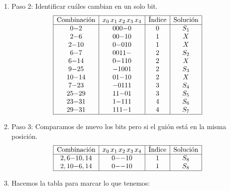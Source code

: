 \documentclass[12pt,letterpaper]{article}
\begin{document}
\begin{enumerate}[label=\arabic*.]
\begin{enumerate}[label=\arabic*)]
  \item Paso 2: Identificar cuáles cambian en un solo bit.
    \[
    \begin{array}{| c | c | c | c |}
      \hline
      \text{Combinación} & x_0\,x_1\,x_2\,x_3\,x_4 & \text{Índice} & \text{Solución} \\
      \hline
      0{-}2   & 000{-}0 & 0 & S_1 \\
      2{-}6   & 00{-}10 & 1 & X \\
      2{-}10  & 0{-}010 & 1 & X \\
      6{-}7   & 0011{-} & 2 & S_2 \\
      6{-}14  & 0{-}110 & 2 & X \\
      9{-}25  & {-}1001 & 2 & S_3 \\
      10{-}14 & 01{-}10 & 2 & X \\
      7{-}23  & {-}0111 & 3 & S_4 \\
      25{-}29 & 11{-}01 & 3 & S_5 \\
      23{-}31 & 1{-}111 & 4 & S_6 \\
      29{-}31 & 111{-}1 & 4 & S_7 \\
      \hline
    \end{array}
    \]

  \item Paso 3: Comparamos de nuevo los bits pero si el guión está en la misma posición.
    \[
    \begin{array}{| c | c | c | c |}
      \hline
      \text{Combinación} & x_0\,x_1\,x_2\,x_3\,x_4 & \text{Índice} & \text{Solución} \\
      \hline
      2,6{-}10,14   & 0{-}{-}10 & 1 & S_8 \\
      2,10{-}6,14   & 0{-}{-}10 & 1 & S_8\\
      \hline
    \end{array}
    \]

  \item Hacemos la tabla para marcar lo que tenemos:
    \begin{table}[H]
      \begin{center}
        \begin{tabular}{| c | c | c | c | c | c | c | c | c | c | c | c |}
          

\end{tabular}
\end{center}
\end{table}
\end{enumerate}
\end{enumerate}
\end{document}
